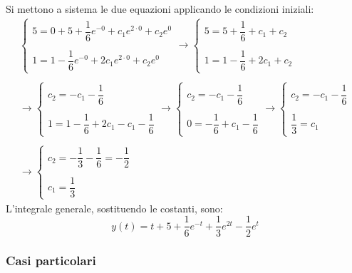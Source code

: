 \documentclass[a4paper]{article}
\begin{document}
	Si mettono a sistema le due equazioni applicando le condizioni iniziali:
	\begin{gather*}
		\begin{cases}
			5 = 0 + 5 + \dfrac{1}{6}e^{-0} + c_{1}e^{2 \cdot 0} + c_{2}e^{0} \\ \\
			1 = 1 - \dfrac{1}{6}e^{-0} + 2c_{1}e^{2 \cdot 0} + c_{2}e^{0}
		\end{cases} \rightarrow
		\begin{cases}
			5 = 5 + \dfrac{1}{6} + c_{1} + c_{2} \\ \\
			1 = 1 - \dfrac{1}{6} + 2c_{1} + c_{2}
		\end{cases} \\ \\
		\rightarrow \begin{cases}
			c_{2} = -c_{1} -\dfrac{1}{6} \\ \\
			1 = 1 - \dfrac{1}{6} + 2c_{1} -c_{1} -\dfrac{1}{6}
		\end{cases} \rightarrow
		\begin{cases}
			c_{2} = -c_{1} -\dfrac{1}{6} \\ \\
			0 = - \dfrac{1}{6} + c_{1} - \dfrac{1}{6}
		\end{cases} \rightarrow
		\begin{cases}
			c_{2} = -c_{1} -\dfrac{1}{6} \\ \\
			\dfrac{1}{3} = c_{1}
		\end{cases} \\ \\
		\rightarrow
		\begin{cases}
			c_{2} = -\dfrac{1}{3} - \dfrac{1}{6} = -\dfrac{1}{2} \\ \\
			c_{1} = \dfrac{1}{3}
		\end{cases}
	\end{gather*}
	L'integrale generale, sostituendo le costanti, sono:
	\begin{equation*}
		y\left(t\right) = t + 5 + \dfrac{1}{6}e^{-t} + \dfrac{1}{3}e^{2t} - \dfrac{1}{2}e^{t}
	\end{equation*}


	\newpage

	\subsubsection{Casi particolari}\label{subsubsection: casi particolari equazioni differenziali}
\end{document}
